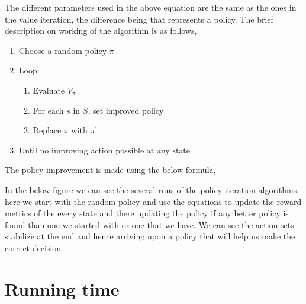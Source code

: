 The different parameters used in the above equation are the same as the ones in
the value iteration, the difference being that   represents a policy. The brief
description on working of the algorithm is as follows, 
\begin{enumerate}
    \item Choose a random policy $\pi$
    \item Loop: 
        \begin{enumerate}
            \item Evaluate $V_\pi$ 
            \item For each $s$ in $S$, set improved policy
            \item Replace $\pi$ with $\pi^\prime$ 
        \end{enumerate}
        \item Until no improving action possible at any state
\end{enumerate}

The policy improvement is made using the below formula,



In the below figure we can see the several runs of the policy iteration
algorithms, here we start with the random policy and use the equations to update
the reward metrics of the every state and there updating the policy if any
better policy is found than one we started with or one that we have. We can see
the action sets stabilize at the end and hence arriving upon a policy that will
help us make the correct decision.
 
 
\section{Running time}


